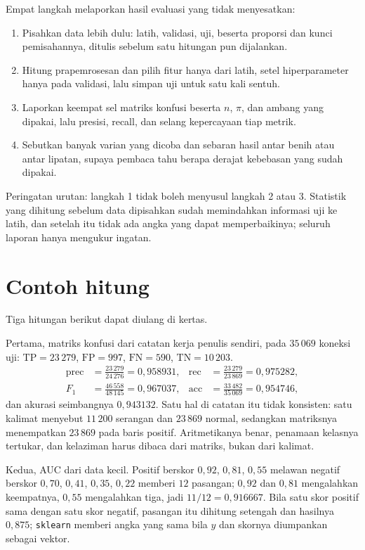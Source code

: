 \begin{resep}
Empat langkah melaporkan hasil evaluasi yang tidak menyesatkan:
\begin{enumerate}
  \item Pisahkan data lebih dulu: latih, validasi, uji, beserta proporsi dan kunci
        pemisahannya, ditulis sebelum satu hitungan pun dijalankan.
  \item Hitung prapemrosesan dan pilih fitur hanya dari latih, setel hiperparameter hanya
        pada validasi, lalu simpan uji untuk satu kali sentuh.
  \item Laporkan keempat sel matriks konfusi beserta $n$, $\pi$, dan ambang yang dipakai,
        lalu presisi, recall, dan selang kepercayaan tiap metrik.
  \item Sebutkan banyak varian yang dicoba dan sebaran hasil antar benih atau antar
        lipatan, supaya pembaca tahu berapa derajat kebebasan yang sudah dipakai.
\end{enumerate}
Peringatan urutan: langkah 1 tidak boleh menyusul langkah 2 atau 3. Statistik yang dihitung
sebelum data dipisahkan sudah memindahkan informasi uji ke latih, dan setelah itu tidak ada
angka yang dapat memperbaikinya; seluruh laporan hanya mengukur ingatan.
\end{resep}

\section{Contoh hitung}

Tiga hitungan berikut dapat diulang di kertas.

Pertama, matriks konfusi dari catatan kerja penulis sendiri, pada $35\,069$ koneksi uji:
$\mathrm{TP}=23\,279$, $\mathrm{FP}=997$, $\mathrm{FN}=590$, $\mathrm{TN}=10\,203$.
\begin{align*}
\operatorname{prec}&=\frac{23\,279}{24\,276}=0{,}958931, &
\operatorname{rec}&=\frac{23\,279}{23\,869}=0{,}975282,\\
F_1&=\frac{46\,558}{48\,145}=0{,}967037, &
\mathrm{acc}&=\frac{33\,482}{35\,069}=0{,}954746,
\end{align*}
dan akurasi seimbangnya $0{,}943132$. Satu hal di catatan itu tidak konsisten: satu
kalimat menyebut $11\,200$ serangan dan $23\,869$ normal, sedangkan matriksnya menempatkan
$23\,869$ pada baris positif. Aritmetikanya benar, penamaan kelasnya tertukar, dan
kelaziman harus dibaca dari matriks, bukan dari kalimat.

Kedua, AUC dari data kecil. Positif berskor $0{,}92$, $0{,}81$, $0{,}55$ melawan negatif
berskor $0{,}70$, $0{,}41$, $0{,}35$, $0{,}22$ memberi $12$ pasangan; $0{,}92$ dan $0{,}81$
mengalahkan keempatnya, $0{,}55$ mengalahkan tiga, jadi $11/12=0{,}916667$. Bila satu skor
positif sama dengan satu skor negatif, pasangan itu dihitung setengah dan hasilnya
$0{,}875$; \texttt{sklearn} memberi angka yang sama bila $y$ dan skornya diumpankan
sebagai vektor.


